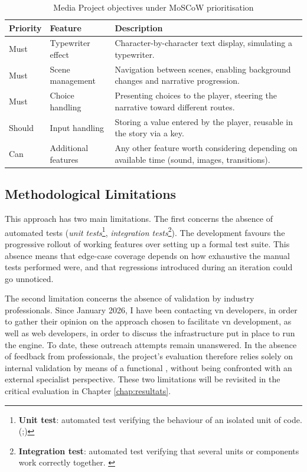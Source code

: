 \begin{table}[H]
    \centering
    \caption{Media Project objectives under MoSCoW prioritisation}
    \renewcommand{\arraystretch}{1.5}
    \begin{tabular}{p{2cm} p{4.5cm} p{6cm}}
        \hline
        \textbf{Priority} & \textbf{Feature} & \textbf{Description} \\
        \hline
        Must & Typewriter effect & Character-by-character text display, simulating a typewriter. \\
        \addlinespace
        Must & Scene management & Navigation between scenes, enabling background changes and narrative progression. \\
        \addlinespace
        Must & Choice handling & Presenting choices to the player, steering the narrative toward different routes. \\
        \addlinespace
        Should & Input handling & Storing a value entered by the player, reusable in the story via a key. \\
        \addlinespace
        Can & Additional features & Any other feature worth considering depending on available time (sound, images, transitions). \\
        \hline
    \end{tabular}
    \label{tab:objectifs_moscow}
\end{table}

\clearpage


\subsection{Methodological Limitations}

This approach has two main limitations. The first concerns the absence of automated tests (\textit{unit tests}\footnote{\textbf{Unit test}: automated test verifying the behaviour of an isolated unit of code. (\cite{beck_test-driven_2002};\cite{aniche_effective_2022})}, \textit{integration tests}\footnote{\textbf{Integration test}: automated test verifying that several units or components work correctly together. \parencite{aniche_effective_2022}}). The development favours the progressive rollout of working features over setting up a formal test suite. This absence means that edge-case coverage depends on how exhaustive the manual tests performed were, and that regressions introduced during an iteration could go unnoticed.

The second limitation concerns the absence of validation by industry professionals. Since January 2026, I have been contacting \gls{vn} developers, in order to gather their opinion on the approach chosen to facilitate \gls{vn} development, as well as web developers, in order to discuss the infrastructure put in place to run the engine. To date, these outreach attempts remain unanswered. In the absence of feedback from professionals, the project's evaluation therefore relies solely on internal validation by means of a functional , without being confronted with an external specialist perspective. These two limitations will be revisited in the critical evaluation in Chapter \ref{chap:resultats}.
